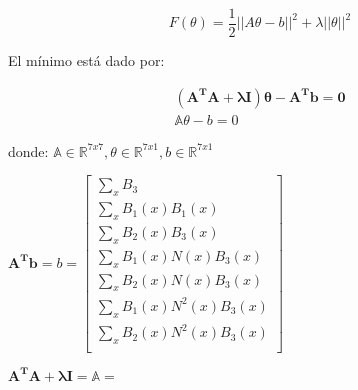 \begin{equation}
F(\theta) = \frac{1}{2}||A\theta - b||^{2} + \lambda||\theta||^{2}
\end{equation}

El mínimo está dado por:

\begin{equation}
\begin{split}
\mathbf{(A^{T}A + \lambda I)\theta - A^{T}b = 0}\\
\mathbb{A}\theta - b = 0
\end{split}
\end{equation}

donde: $\mathbb{A} \in \mathbb{R}^{7x7}, \theta \in \mathbb{R}^{7x1}, b \in \mathbb{R}^{7x1}$

\begin{center}
$\mathbf{A^{T}b} = b = \begin{bmatrix}
\sum_{x} B_{3} \\
\sum_{x} B_{1}(x) B_{1}(x) \\
\sum_{x} B_{2}(x) B_{3}(x) \\
\sum_{x} B_{1}(x) N(x)  B_{3}(x) \\
\sum_{x} B_{2}(x) N(x)  B_{3}(x) \\	
\sum_{x} B_{1}(x) N^{2}(x)  B_{3}(x) \\
\sum_{x} B_{2}(x) N^{2}(x)  B_{3}(x) \\
\end{bmatrix}$
\end{center}

$\mathbf{A^{T}A + \lambda I} = \mathbb{A} = $

